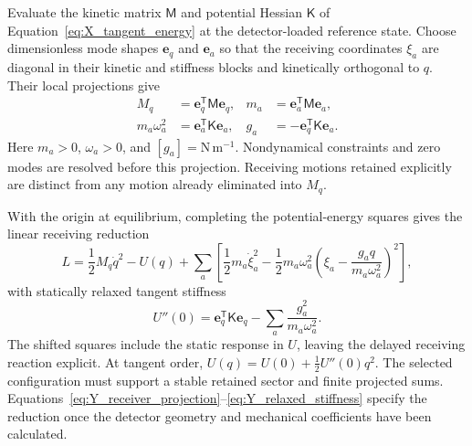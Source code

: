 Evaluate the kinetic matrix $\mathsf M$ and potential Hessian $\mathsf K$ of Equation~\eqref{eq:X_tangent_energy} at the detector-loaded reference state. Choose dimensionless mode shapes $\mathbf e_q$ and $\mathbf e_a$ so that the receiving coordinates $\xi_a$ are diagonal in their kinetic and stiffness blocks and kinetically orthogonal to $q$. Their local projections give
\begin{align}
    M_q&=\mathbf e_q^{\mathsf T}\mathsf M\mathbf e_q,
    &m_a&=\mathbf e_a^{\mathsf T}\mathsf M\mathbf e_a,
    \nonumber\\
    m_a\omega_a^2&=\mathbf e_a^{\mathsf T}\mathsf K\mathbf e_a,
    &g_a&=-\mathbf e_q^{\mathsf T}\mathsf K\mathbf e_a.
    \label{eq:Y_receiver_projection}
\end{align}
Here $m_a>0$, $\omega_a>0$, and $[g_a]=\mathrm{N\,m^{-1}}$. Nondynamical constraints and zero modes are resolved before this projection. Receiving motions retained explicitly are distinct from any motion already eliminated into $M_q$.

With the origin at equilibrium, completing the potential-energy squares gives the linear receiving reduction
\begin{equation}
    L=\frac12M_q\dot q^2-U(q)
    +\sum_a\left[
        \frac12m_a\dot\xi_a^2
        -\frac12m_a\omega_a^2
        \left(\xi_a-\frac{g_aq}{m_a\omega_a^2}\right)^2
    \right],
    \label{eq:Y_coupled_mechanical_reduction}
\end{equation}
with statically relaxed tangent stiffness
\begin{equation}
    U''(0)=\mathbf e_q^{\mathsf T}\mathsf K\mathbf e_q
    -\sum_a\frac{g_a^2}{m_a\omega_a^2}.
    \label{eq:Y_relaxed_stiffness}
\end{equation}
The shifted squares include the static response in $U$, leaving the delayed receiving reaction explicit. At tangent order, $U(q)=U(0)+\tfrac12U''(0)q^2$. The selected configuration must support a stable retained sector and finite projected sums. Equations~\eqref{eq:Y_receiver_projection}--\eqref{eq:Y_relaxed_stiffness} specify the reduction once the detector geometry and mechanical coefficients have been calculated.

